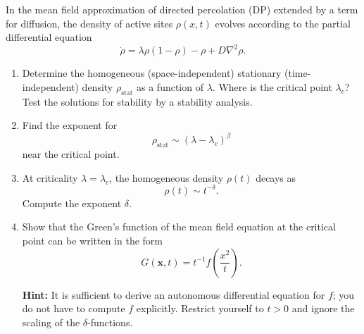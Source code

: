 \begin{Problem}

In the mean field approximation of directed percolation (DP) extended by a term for diffusion, the density of active sites $\rho(x,t)$ evolves according to the partial differential equation
\[
\dot{\rho}
=
\lambda\rho(1-\rho)-\rho
+
D\nabla^2\rho.
\]

\begin{enumerate}[label=(\alph*)]

\item
Determine the homogeneous (space-independent) stationary (time-independent) density $\rho_{\mathrm{stat}}$ as a function of $\lambda$. Where is the critical point $\lambda_c$? Test the solutions for stability by a stability analysis.

\item
Find the exponent for
\[
\rho_{\mathrm{stat}}
\sim
(\lambda-\lambda_c)^\beta
\]
near the critical point.

\item
At criticality $\lambda=\lambda_c$, the homogeneous density $\rho(t)$ decays as
\[
\rho(t)\sim t^{-\delta}.
\]
Compute the exponent $\delta$.

\item
Show that the Green's function of the mean field equation at the critical point can be written in the form
\[
G(\mathbf{x},t)
=
t^{-1}
f\!\left(\frac{x^2}{t}\right).
\]

\textbf{Hint:} It is sufficient to derive an autonomous differential equation for $f$; you do not have to compute $f$ explicitly. Restrict yourself to $t>0$ and ignore the scaling of the $\delta$-functions.

\end{enumerate}

\end{Problem}
